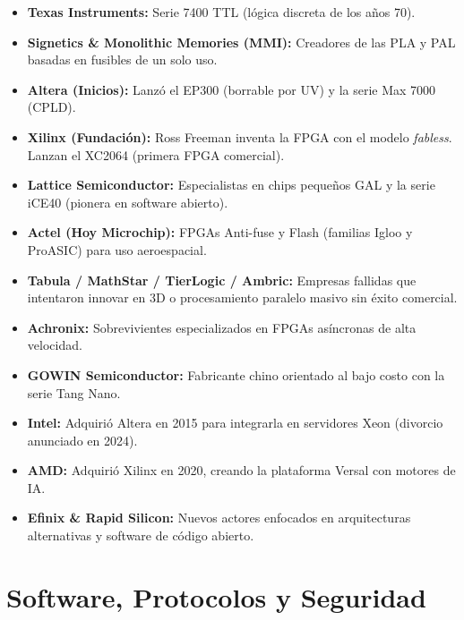 \documentclass[a4paper,12pt]{article}
\begin{document}
\begin{itemize}
	
	\item \textbf{Texas Instruments:} Serie 7400 TTL (lógica discreta de los años 70).
	
	\item \textbf{Signetics \& Monolithic Memories (MMI):} Creadores de las PLA y PAL basadas en fusibles de un solo uso.
	
	\item \textbf{Altera (Inicios):} Lanzó el EP300 (borrable por UV) y la serie Max 7000 (CPLD).
	
	\item \textbf{Xilinx (Fundación):} Ross Freeman inventa la FPGA con el modelo \textit{fabless}. Lanzan el XC2064 (primera FPGA comercial).
	
	\item \textbf{Lattice Semiconductor:} Especialistas en chips pequeños GAL y la serie iCE40 (pionera en software abierto).
	
	\item \textbf{Actel (Hoy Microchip):} FPGAs Anti-fuse y Flash (familias Igloo y ProASIC) para uso aeroespacial.
	
	\item \textbf{Tabula / MathStar / TierLogic / Ambric:} Empresas fallidas que intentaron innovar en 3D o procesamiento paralelo masivo sin éxito comercial.
	
	\item \textbf{Achronix:} Sobrevivientes especializados en FPGAs asíncronas de alta velocidad.
	
	\item \textbf{GOWIN Semiconductor:} Fabricante chino orientado al bajo costo con la serie Tang Nano.
	
	\item \textbf{Intel:} Adquirió Altera en 2015 para integrarla en servidores Xeon (divorcio anunciado en 2024).
	
	\item \textbf{AMD:} Adquirió Xilinx en 2020, creando la plataforma Versal con motores de IA.
	
	\item \textbf{Efinix \& Rapid Silicon:} Nuevos actores enfocados en arquitecturas alternativas y software de código abierto.
	
\end{itemize}




\section*{Software, Protocolos y Seguridad}
\end{document}
